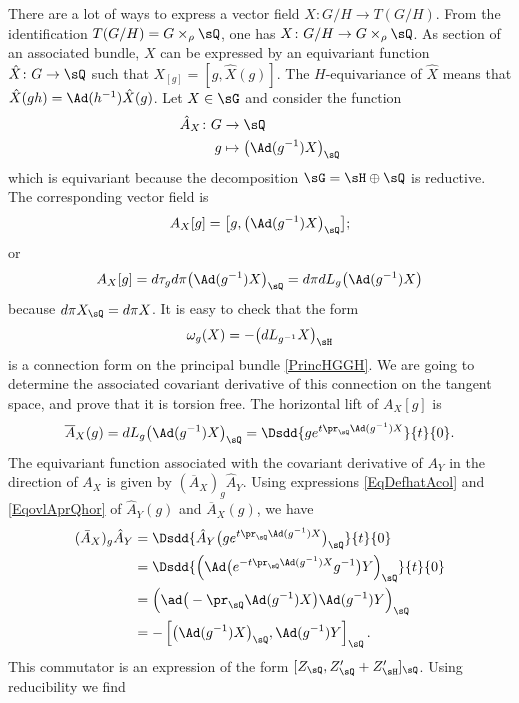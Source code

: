 There are a lot of ways to express a vector field $X\colon G/H\to T(G/H)$. From the identification $T(G/H)=G\times_{\rho}\sQ$, one has $X\colon G/H\to G\times_{\rho}\sQ$. As section of an associated bundle, $X$ can be expressed by an equivariant function $\hat{X}\colon G\to \sQ$ such that $X_{[g]}=[g,\hat{X}(g)]$. The $H$-equivariance of $\hat X$ means that $\hat{X}(gh)=\Ad(h^{-1})\hat{X}(g)$.  Let $X\in\sG$ and consider the function
\begin{equation}        \label{EqDefhatAcol}
\begin{aligned}
 \hat A_X\colon G&\to \sQ \\ 
g&\mapsto \big( \Ad(g^{-1})X \big)_{\sQ} 
\end{aligned}
\end{equation} 
which is equivariant because the decomposition $\sG=\sH\oplus\sQ$ is reductive. The corresponding vector field is
\[ 
  A_X[g]=\big[ g,\big( \Ad(g^{-1})X \big)_{\sQ} \big];
\]
or
\[ 
  A_X[g]=d\tau_gd\pi\big( \Ad(g^{-1})X \big)_{\sQ}=d\pi dL_g\big( \Ad(g^{-1})X \big)
\]
because $d\pi X_{\sQ}=d\pi X$. It is easy to check that the form
\[ 
  \omega_g(X)=-\big( dL_{g^{-1}}X \big)_{\sH}
\]
is a connection form on the principal bundle \eqref{PrincHGGH}.  We are going to determine the associated covariant derivative of this connection on the tangent space, and prove that it is torsion free. The horizontal lift of $A_X[g]$ is 
\begin{equation}    \label{EqovlAprQhor}
  \overline{ A }_X(g)=dL_g\big( \Ad(g^{-1})X \big)_{\sQ}=\Dsdd{ g e^{t\pr_{\sQ}\Ad(g^{-1})X} }{t}{0}.
\end{equation}
The equivariant function associated with the covariant derivative of $A_Y$ in the direction of $A_X$ is given by $(\overline{ A }_X)_g\hat A_Y$. Using expressions  \eqref{EqDefhatAcol} and  \eqref{EqovlAprQhor} of $\hat A_Y(g)$ and $\overline{ A }_X(g)$, we have
\[ 
\begin{split}
  (\bar A_X)_g\hat A_Y  &=\Dsdd{ \hat A_Y\big( g e^{t\pr_{\sQ}\Ad(g^{-1})X} \big)_{\sQ} }{t}{0}\\
            &=\Dsdd{ \left( \Ad\big(  e^{-t\pr_{\sQ}\Ad(g^{-1})X}g^{-1}  \big)Y \right)_{\sQ} }{t}{0}\\
            &=\Big( \ad\big( -\pr_{\sQ}\Ad(g^{-1})X \big)\Ad(g^{-1})Y \Big)_{\sQ}\\
            &=-\left[ \big( \Ad(g^{-1})X \big)_{\sQ},\Ad(g^{-1})Y  \right]_{\sQ}.
\end{split}  
\]
This commutator is an expression of the form $[Z_{\sQ},Z'_{\sQ}+Z'_{\sH}]_{\sQ}$. Using reducibility we find

